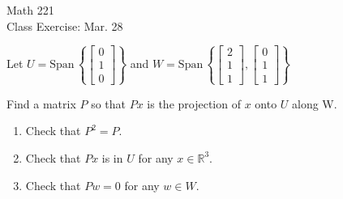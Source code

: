 \documentclass[11pt]{article}
\newcommand{\Span}{\textrm{Span}\,}
\begin{document}
\begin{center}
\Large
\rm{Math 221}
\\
\rm{Class Exercise:  Mar. 28}
\\
\end{center}
\vspace{0.2in}

Let $U = \Span\left\{\left[ \begin{array}{c} 0 \\ 1 \\ 0   \end{array}\right]\right\}$ and
$W = \Span\left\{
\left[ \begin{array}{c} 2 \\ 1 \\ 1  \end{array}\right],
\left[ \begin{array}{c} 0 \\ 1 \\ 1  \end{array}\right]
\right\}$

\vspace{0.2in}

Find a matrix $P$ so that $Px$ is the projection of $x$ onto $U$ along W.  
\begin{enumerate}
	\item {Check that $P^2=P$.}
	\item {Check that $Px$ is in $U$ for any $x\in\mathbb{R}^3$.}
	\item {Check that $Pw=0$ for any $w\in W$.}
\end{enumerate}
\end{document}

